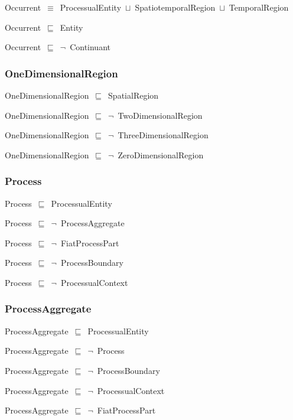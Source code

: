 \documentclass{article}
\begin{document}
Occurrent~\ensuremath{\equiv}~ProcessualEntity~\ensuremath{\sqcup}~SpatiotemporalRegion~\ensuremath{\sqcup}~TemporalRegion

Occurrent~\ensuremath{\sqsubseteq}~Entity~

Occurrent~\ensuremath{\sqsubseteq}~\ensuremath{\lnot}~Continuant

\subsubsection*{OneDimensionalRegion}

OneDimensionalRegion~\ensuremath{\sqsubseteq}~SpatialRegion~

OneDimensionalRegion~\ensuremath{\sqsubseteq}~\ensuremath{\lnot}~TwoDimensionalRegion

OneDimensionalRegion~\ensuremath{\sqsubseteq}~\ensuremath{\lnot}~ThreeDimensionalRegion

OneDimensionalRegion~\ensuremath{\sqsubseteq}~\ensuremath{\lnot}~ZeroDimensionalRegion

\subsubsection*{Process}

Process~\ensuremath{\sqsubseteq}~ProcessualEntity~

Process~\ensuremath{\sqsubseteq}~\ensuremath{\lnot}~ProcessAggregate

Process~\ensuremath{\sqsubseteq}~\ensuremath{\lnot}~FiatProcessPart

Process~\ensuremath{\sqsubseteq}~\ensuremath{\lnot}~ProcessBoundary

Process~\ensuremath{\sqsubseteq}~\ensuremath{\lnot}~ProcessualContext

\subsubsection*{ProcessAggregate}

ProcessAggregate~\ensuremath{\sqsubseteq}~ProcessualEntity~

ProcessAggregate~\ensuremath{\sqsubseteq}~\ensuremath{\lnot}~Process

ProcessAggregate~\ensuremath{\sqsubseteq}~\ensuremath{\lnot}~ProcessBoundary

ProcessAggregate~\ensuremath{\sqsubseteq}~\ensuremath{\lnot}~ProcessualContext

ProcessAggregate~\ensuremath{\sqsubseteq}~\ensuremath{\lnot}~FiatProcessPart
\end{document}

